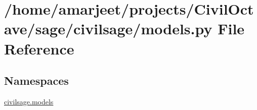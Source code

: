 \hypertarget{a00013}{}\section{/home/amarjeet/projects/\+Civil\+Octave/sage/civilsage/models.py File Reference}
\label{a00013}
\subsection*{Namespaces}
\begin{DoxyCompactItemize}
\item 
 \hyperlink{a00033}{civilsage.\+models}
\end{DoxyCompactItemize}
